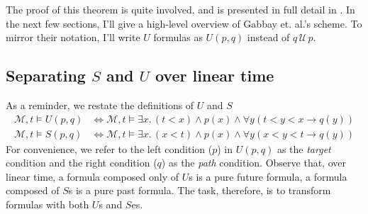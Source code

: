 \documentclass[a4paper,UKenglish,cleveref, autoref, thm-restate]{lipics-v2021}
\begin{document}
The proof of this theorem is quite involved, and is presented in full detail in \cite{gabbay1994}. In the next few sections, I'll give a high-level overview of Gabbay et. al.'s scheme. To mirror their notation, I'll write $U$ formulas as $U(p, q)$ instead of $q \,\mathcal{U}\, p$.

\subsection{Separating $S$ and $U$ over linear time}

As a reminder, we restate the definitions of $U$ and $S$
\begin{equation*}
    \begin{aligned}
        \mathcal{M}, t \vDash U(p, q) &\Longleftrightarrow \mathcal{M}, t \vDash \exists x.\, (t < x) \land p(x) \land \forall y \left( t < y < x \to q\left( y \right) \right)\\
        \mathcal{M}, t \vDash S(p, q) &\Longleftrightarrow \mathcal{M}, t \vDash \exists x.\, (x < t) \land p(x) \land \forall y \left( x < y < t \to q\left( y \right) \right)
    \end{aligned}
\end{equation*}
For convenience, we refer to the left condition ($p$) in $U(p, q)$ as the \textit{target} condition and the right condition ($q$) as the \textit{path} condition. Observe that, over linear time, a formula composed only of $U$s is a pure future formula, a formula composed of $S$s is a pure past formula. The task, therefore, is to transform formulas with both $U$s and $S$es.
\end{document}
